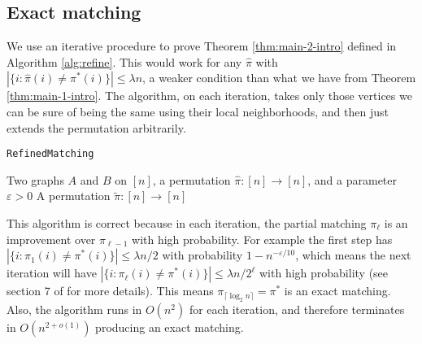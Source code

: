 \documentclass[11pt]{article}
\begin{document}
\subsection{Exact matching}
We use an iterative procedure to prove Theorem \ref{thm:main-2-intro} defined in Algorithm \ref{alg:refine}. This would work for any $ \hat \pi $ with $ |\{ i:\hat \pi(i) \neq \pi^*(i) \}| \leq \lambda n $, a weaker condition than what we have from Theorem \ref{thm:main-1-intro}. The algorithm, on each iteration, takes only those vertices we can be sure of being the same using their local neighborhoods, and then just extends the permutation arbitrarily.

\begin{algorithm}[ht]
	\normalsize
	\caption{{\tt RefinedMatching}}
	\label{alg:refine}
	\begin{algorithmic}[1]
		\Input Two graphs $A$ and $B$ on $[n]$, a permutation $\hat \pi : [n] \to [n]$, and a parameter $\varepsilon > 0$
		\Output A permutation $\tilde \pi : [n] \to [n]$
		\State{$\pi_0 \leftarrow \hat \pi$}
		\EndFor
		\EndFor
		\State{\Return $\tilde \pi$}
	\end{algorithmic}
\end{algorithm}
This algorithm is correct because in each iteration, the partial matching $ \pi_{\ell} $  is an improvement over $ \pi_{\ell-1} $ with high probability. For example the first step has $ |\{ i:\pi_1(i)\neq \pi^*(i) \}| \leq \lambda n/2 $ with probability $ 1-n^{-\varepsilon/10} $, which means the next iteration will have $ |\{ i:\pi_\ell(i)\neq \pi^*(i) \}| \leq \lambda n/2^\ell $ with high probability (see section 7 of \cite{mao2021exact} for more details). This means $ \pi_{\lceil \log_2 n \rceil} = \pi^* $ is an exact matching. Also, the algorithm runs in $ O(n^2) $ for each iteration, and therefore terminates in $ O(n^{2+o(1)}) $ producing an exact matching.
	
	
	
\end{document}
